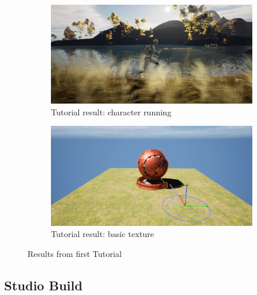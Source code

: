 \documentclass[
  a4paper,  %
  twoside,  %
  bibliography=totoc,
  headsepline,
  cleardoublepage=empty,
  parskip=half,
  draft=false
]{scrbook}
\begin{document}
\begin{figure}[h]
  \begin{subfigure}{0.45\textwidth}
    \includegraphics[width=\linewidth]{graphics/unreal-engine/Basics/Landscape-running.png}
    \caption{Tutorial result: character running}
  \end{subfigure}
  \begin{subfigure}{0.45\textwidth}
    \includegraphics[width=\linewidth]{graphics/unreal-engine/Basics/Texture.png}
    \caption{Tutorial result: basic texture}
  \end{subfigure}
  \caption{Results from first Tutorial}
  \label{fig:ue-basic-tutorial}
\end{figure}

\subsection*{Studio Build}
\end{document}
